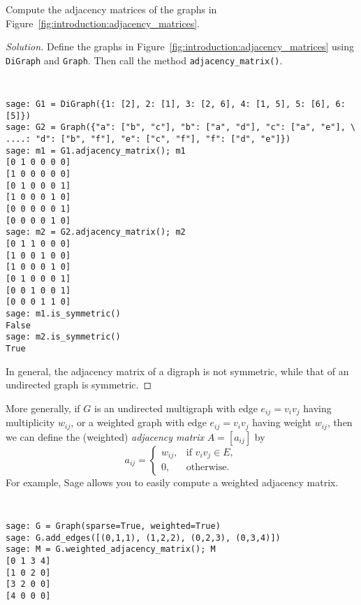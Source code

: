 \begin{example}
Compute the adjacency matrices of the graphs in
Figure~\ref{fig:introduction:adjacency_matrices}.
\end{example}

\begin{proof}[Solution]
Define the graphs in Figure~\ref{fig:introduction:adjacency_matrices}
using \verb!DiGraph! and \verb!Graph!. Then call the method
\verb!adjacency_matrix()!.
%
\begin{center}
\fontsize{9pt}{9pt}
\selectfont
\tt
\begin{lstlisting}
sage: G1 = DiGraph({1: [2], 2: [1], 3: [2, 6], 4: [1, 5], 5: [6], 6: [5]})
sage: G2 = Graph({"a": ["b", "c"], "b": ["a", "d"], "c": ["a", "e"], \
....: "d": ["b", "f"], "e": ["c", "f"], "f": ["d", "e"]})
sage: m1 = G1.adjacency_matrix(); m1
[0 1 0 0 0 0]
[1 0 0 0 0 0]
[0 1 0 0 0 1]
[1 0 0 0 1 0]
[0 0 0 0 0 1]
[0 0 0 0 1 0]
sage: m2 = G2.adjacency_matrix(); m2
[0 1 1 0 0 0]
[1 0 0 1 0 0]
[1 0 0 0 1 0]
[0 1 0 0 0 1]
[0 0 1 0 0 1]
[0 0 0 1 1 0]
sage: m1.is_symmetric()
False
sage: m2.is_symmetric()
True
\end{lstlisting}
\end{center}
%
In general, the adjacency matrix of a digraph is not symmetric, while
that of an undirected graph is symmetric.
\end{proof}


More generally, if $G$ is an undirected multigraph with edge
$e_{ij} = v_i v_j$ having multiplicity $w_{ij}$, or a weighted
graph with edge $e_{ij} = v_i v_j$ having weight $w_{ij}$, then we
can define the (weighted) \emph{adjacency matrix} $A = [a_{ij}]$ by
\[
a_{ij}
=
\begin{cases}
w_{ij}, & \text{if $v_i v_j \in E$}, \\
0,      & \text{otherwise}.
\end{cases}
\]
For example, Sage allows you to easily compute a weighted adjacency
matrix.
%
\begin{center}
\fontsize{9pt}{9pt}
\selectfont
\tt
\begin{lstlisting}
sage: G = Graph(sparse=True, weighted=True)
sage: G.add_edges([(0,1,1), (1,2,2), (0,2,3), (0,3,4)])
sage: M = G.weighted_adjacency_matrix(); M
[0 1 3 4]
[1 0 2 0]
[3 2 0 0]
[4 0 0 0]
\end{lstlisting}
\end{center}


